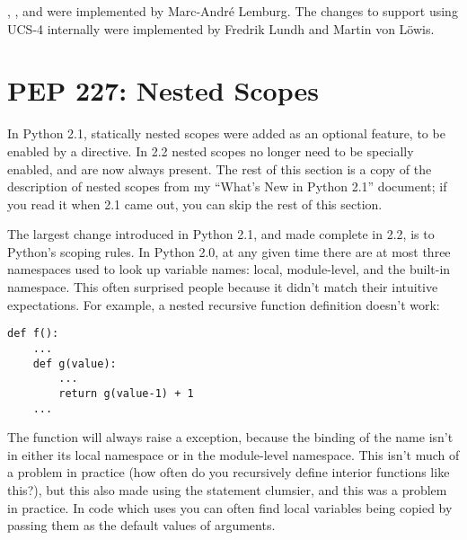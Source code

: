 \documentclass{howto}
\begin{document}
, , and  were
implemented by Marc-Andr\'e Lemburg.  The changes to support using
UCS-4 internally were implemented by Fredrik Lundh and Martin von
L\"owis.

\begin{seealso}


\end{seealso}


\section{PEP 227: Nested Scopes}

In Python 2.1, statically nested scopes were added as an optional
feature, to be enabled by a  directive.  In 2.2 nested scopes no longer need to be
specially enabled, and are now always present.  The rest of this section
is a copy of the description of nested scopes from my ``What's New in
Python 2.1'' document; if you read it when 2.1 came out, you can skip
the rest of this section.

The largest change introduced in Python 2.1, and made complete in 2.2,
is to Python's scoping rules.  In Python 2.0, at any given time there
are at most three namespaces used to look up variable names: local,
module-level, and the built-in namespace.  This often surprised people
because it didn't match their intuitive expectations.  For example, a
nested recursive function definition doesn't work:

\begin{verbatim}
def f():
    ...
    def g(value):
        ...
        return g(value-1) + 1
    ...
\end{verbatim}

The function  will always raise a 
exception, because the binding of the name  isn't in either
its local namespace or in the module-level namespace.  This isn't much
of a problem in practice (how often do you recursively define interior
functions like this?), but this also made using the 
statement clumsier, and this was a problem in practice.  In code which
uses  you can often find local variables being copied
by passing them as the default values of arguments.
\end{document}
